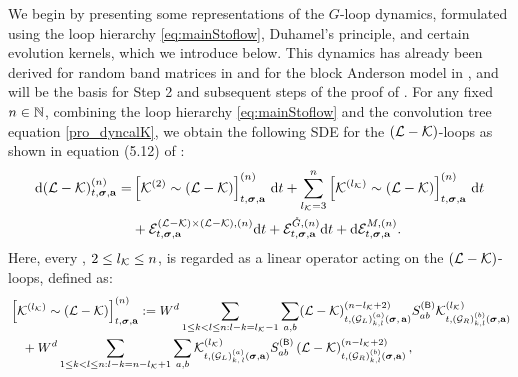 We begin by presenting some representations of the $G$-loop dynamics, formulated using the loop hierarchy \eqref{eq:mainStoflow}, Duhamel's principle, and certain evolution kernels, which we introduce below. This dynamics has already been derived for random band matrices in \cite{YY_25} and for the block Anderson model in \cite{RBSO1D}, and will be the basis for Step 2 and subsequent steps of the proof of . 
For any fixed $n\in \mathbb{N}$, combining the loop hierarchy \eqref{eq:mainStoflow} and the convolution tree equation \eqref{pro_dyncalK}, we obtain the following SDE for the $(\mathcal L-\mathcal K)$-loops as shown in equation (5.12) of \cite{YY_25}: 
\begin{align}\label{eq_L-Keee}
    \mathrm{d}(\mathcal{L} - \mathcal{K})^{(n)}_{t, {\boldsymbol{\sigma}}, {\mathbf{a}}} = &\left[\mathcal K^{(2)} \sim (\mathcal{L} - \mathcal{K})\right]^{(n)}_{t, {\boldsymbol{\sigma}}, {\mathbf{a}}} \, \mathrm{d} t+\sum_{l_{\mathcal K}=3}^n \left[\mathcal K^{(l_{\mathcal K})}\sim (\mathcal{L} - \mathcal{K})\right]^{(n)}_{t, {\boldsymbol{\sigma}}, {\mathbf{a}}}\, \mathrm{d} t \nonumber\\
    &+ \mathcal{E}^{(\mathcal L-\mathcal K)\times (\mathcal L-\mathcal K),(n)}_{t, {\boldsymbol{\sigma}}, {\mathbf{a}}}\mathrm{d} t+\mathcal{E}^{{\mathring G},(n)}_{t, {\boldsymbol{\sigma}}, {\mathbf{a}}}\mathrm{d} t + \mathrm{d}\mathcal{E}^{M,(n)}_{t, {\boldsymbol{\sigma}}, {\mathbf{a}}} .
\end{align} 
Here, every \smash{$\cK^{(\lenk)}$}, $2\le l_{\mathcal K}\le n$, is regarded as a linear operator acting on the $(\mathcal L-\mathcal K)$-loops, defined as:
\begin{align}\label{DefKsimLK}
&\left[\mathcal K^{(l_{\mathcal K})}\sim (\mathcal{L} - \mathcal{K})\right]_{t, {\boldsymbol{\sigma}}, {\mathbf{a}}}^{(n)}:= W^d \sum_{1\le k < l \leq n : l-k=l_{\mathcal K}-1} \sum_{a,b} 
   (\mathcal{L} - \mathcal{K})^{(n-l_{\mathcal K}+2)}_{t, (\mathcal{G}_L)^{(a)}_{k, l}\left({\boldsymbol{\sigma}},\, {\mathbf{a}}\right)} 
S^{({\mathsf{B}})}_{ab}\mathcal{K}^{(l_{\mathcal K})}_{t,(\mathcal{G}_R)^{(b)}_{k,l}\left({\boldsymbol{\sigma}} ,{\mathbf{a}}\right)} \nonumber\\
&\quad +  W^d \sum_{1 \leq k < l \leq n:l-k=n-l_{\mathcal K}+1} \sum_{a,b} \mathcal{K}^{(l_{\mathcal K})}_{t, (\mathcal{G}_L)^{(a)}_{k, \,l}\left({\boldsymbol{\sigma}},{\mathbf{a}}\right)} S^{({\mathsf{B}})}_{ab}
   \left(\mathcal L-\mathcal K\right)^{(n-l_{\mathcal K}+2)}_{t,(\mathcal{G}_R)^{(b)}_{k, l}\left({\boldsymbol{\sigma}},{\mathbf{a}}\right)} ,
\end{align}
